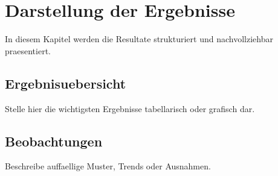 \section{Darstellung der Ergebnisse}

In diesem Kapitel werden die Resultate strukturiert und nachvollziehbar
praesentiert.

\subsection{Ergebnisuebersicht}

Stelle hier die wichtigsten Ergebnisse tabellarisch oder grafisch dar.

\subsection{Beobachtungen}

Beschreibe auffaellige Muster, Trends oder Ausnahmen.
